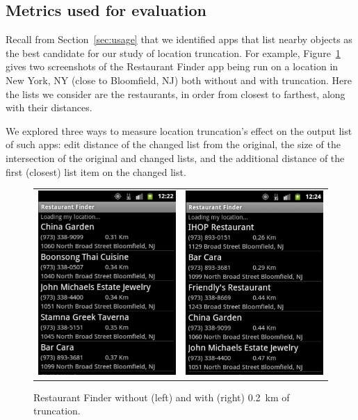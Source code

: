 \documentclass[10pt, conference, compsocconf]{IEEEtran}
\begin{document}
\subsection{Metrics used for evaluation}
\label{sec:metrics}

Recall from Section~\ref{sec:usage} that we identified apps that list
nearby objects as the best candidate for our study of location
truncation. For example, Figure~\ref{fig:app-example} gives two
screenshots of the Restaurant Finder app being run on a location in
New York, NY (close to Bloomfield, NJ) both without and with
truncation. Here the lists we consider are the restaurants, in order
from closest to farthest, along with their distances.

We explored three ways to measure location truncation's effect on
the output list of such apps: edit distance of the changed list from the
original, the size of the intersection of the original and changed
lists, and the additional distance of the first (closest) list item on
the changed list.

\begin{figure}
  \centering
  \begin{tabular}{cc}
    \includegraphics[width=.4\columnwidth]{restaurant_finder_ref_screenshot}
    & 
    \includegraphics[width=.4\columnwidth]{restaurant_finder_nominal_screenshot}
  \end{tabular}
  \caption{Restaurant Finder without (left) and with (right)
    0.2~km of truncation.}
  \label{fig:app-example}
\end{figure}
\end{document}
